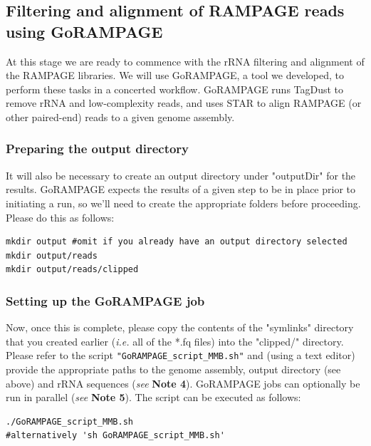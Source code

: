 \documentclass[runningheads,a4paper]{llncs}
\begin{document}
\begin{linenumbers}
\subsection{Filtering and alignment of RAMPAGE reads using GoRAMPAGE}

At this stage we are ready to commence with the rRNA filtering and alignment of the RAMPAGE libraries.
We will use GoRAMPAGE, a tool we developed, to perform these tasks in a concerted workflow. 
GoRAMPAGE runs TagDust \cite{Lassmann:2015gs} to remove rRNA and low-complexity reads, and uses STAR \cite{Dobin:2016kq} to align RAMPAGE (or other paired-end) reads to a given genome assembly.\\

\subsubsection{Preparing the output directory}

It will also be necessary to create an output directory under "outputDir" for the results.
GoRAMPAGE expects the results of a given step to be in place prior to initiating a run, so we'll need to create the appropriate folders before proceeding.
Please do this as follows:

\noindent
\begin{verbatim}
mkdir output #omit if you already have an output directory selected
mkdir output/reads
mkdir output/reads/clipped
\end{verbatim}

\subsubsection{Setting up the GoRAMPAGE job}

Now, once this is complete, please copy the contents of the "symlinks" directory that you created earlier (\textit{i.e.} all of the *.fq files) into the "clipped/" directory.
Please refer to the script \texttt{"GoRAMPAGE\_script\_MMB.sh"} and (using a text editor) provide the appropriate paths to the genome assembly, output directory (see above) and rRNA sequences (\textit{see} \textbf{Note 4}). 
GoRAMPAGE jobs can optionally be run in parallel (\textit{see} \textbf{Note 5}).
The script can be executed as follows:

\noindent
\begin{verbatim}
./GoRAMPAGE_script_MMB.sh
#alternatively 'sh GoRAMPAGE_script_MMB.sh'
\end{verbatim}


\end{linenumbers}
\end{document}
